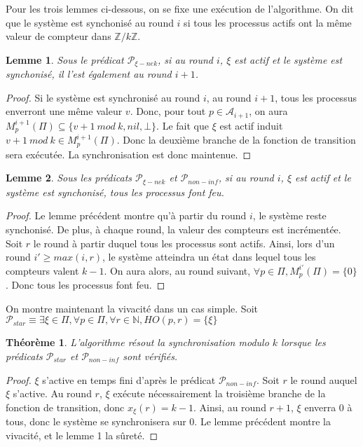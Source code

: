 \documentclass{article}
\newtheorem{lemma}{Lemme}
\newtheorem{theorem}{Théorème}
\begin{document}
Pour les trois lemmes ci-dessous, on se fixe une exécution de l'algorithme.
On dit que le système est synchonisé au round $i$ si tous les processus actifs ont la même valeur de compteur dans $\mathds{Z}/k\mathds{Z}$.

\begin{lemma}
	Sous le prédicat $\mathcal{P}_{\xi-nek}$,
	si au round $i$, $\xi$ est actif et le système est synchonisé, il l'est également au round $i+1$.
\end{lemma}
\begin{proof}
	Si le système est synchronisé au round $i$, au round $i+1$, tous les processus enverront une même valeur $v$.
	Donc, pour tout $p \in \mathcal{A}_{i+1}$, on aura $M_p^{i+1}(\Pi) \subseteq \{v+1~mod~k, nil, \bot\}$.
	Le fait que $\xi$ est actif induit $v+1~mod~k \in M_p^{i+1}(\Pi)$.
	Donc la deuxième branche de la fonction de transition sera exécutée.
	La synchronisation est donc maintenue.
\end{proof}
\begin{lemma}
	Sous les prédicats $\mathcal{P}_{\xi-nek}$ et $\mathcal{P}_{non-inf}$,
	si au round $i$, $\xi$ est actif et le système est synchonisé, tous les processus font feu.
\end{lemma}
\begin{proof}
	Le lemme précédent montre qu'à partir du round $i$, le système reste synchonisé. De plus, à chaque round, la valeur des compteurs est incrémentée.
	Soit $r$ le round à partir duquel tous les processus sont actifs.
	Ainsi, lors d'un round $i' \geq max(i, r)$, le système atteindra un état dans lequel tous les compteurs valent $k-1$.
	On aura alors, au round suivant, $\forall p \in \Pi, M_p^{i'}(\Pi) = \{0\}$.
	Donc tous les processus font feu.
\end{proof}

On montre maintenant la vivacité dans un cas simple.
Soit $\mathcal{P}_{star} \equiv \exists \xi \in \Pi, \forall p \in \Pi, \forall r \in \mathds{N}, HO(p, r) = \{\xi\}$

\begin{theorem}
	L'algorithme résout la synchronisation modulo $k$ lorsque les prédicats $\mathcal{P}_{star}$ et $\mathcal{P}_{non-inf}$ sont vérifiés.
\end{theorem}
\begin{proof}
	$\xi$ s'active en temps fini d'après le prédicat $\mathcal{P}_{non-inf}$.
	Soit $r$ le round auquel $\xi$ s'active.
	Au round $r$, $\xi$ exécute nécessairement la troisième branche de la fonction de transition, donc $x_\xi(r) = k-1$.
	Ainsi, au round $r+1$, $\xi$ enverra 0 à tous, donc le système se synchronisera sur 0.
	Le lemme précédent montre la vivacité, et le lemme 1 la sûreté.
\end{proof}
\end{document}
